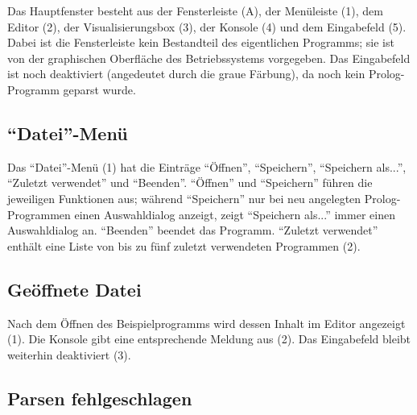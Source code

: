 \documentclass[parskip=full,11pt,twoside]{scrartcl}
\begin{document}
Das Hauptfenster besteht aus der Fensterleiste (A), der Menüleiste (1), dem Editor (2), der Visualisierungsbox (3), der Konsole (4) und dem Eingabefeld (5).
Dabei ist die Fensterleiste kein Bestandteil des eigentlichen Programms; sie ist von der graphischen Oberfläche des Betriebssystems vorgegeben.
Das Eingabefeld ist noch deaktiviert (angedeutet durch die graue Färbung), da noch kein Prolog-Programm geparst wurde.

\subsection{\enquote{Datei}-Menü}

\begin{minipage}{\linewidth}
\end{minipage}

Das \enquote{Datei}-Menü (1) hat die Einträge \enquote{Öffnen}, \enquote{Speichern}, \enquote{Speichern als...}, \enquote{Zuletzt verwendet} und \enquote{Beenden}.
\enquote{Öffnen} und \enquote{Speichern} führen die jeweiligen Funktionen aus; während \enquote{Speichern} nur bei neu angelegten Prolog-Programmen einen Auswahldialog anzeigt, zeigt \enquote{Speichern als...} immer einen Auswahldialog an.
\enquote{Beenden} beendet das Programm.
\enquote{Zuletzt verwendet} enthält eine Liste von bis zu fünf zuletzt verwendeten Programmen (2).

\subsection{Geöffnete Datei}

\begin{minipage}{\linewidth}
\end{minipage}

Nach dem Öffnen des Beispielprogramms wird dessen Inhalt im Editor angezeigt (1).
Die Konsole gibt eine entsprechende Meldung aus (2).
Das Eingabefeld bleibt weiterhin deaktiviert (3).

\subsection{Parsen fehlgeschlagen}
\end{document}
